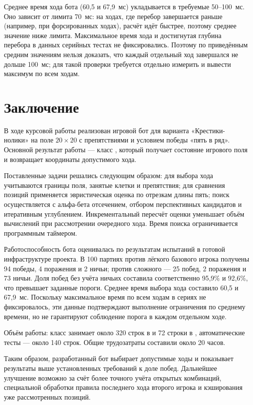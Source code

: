 \documentclass[14pt,a4paper]{extarticle}
\newcommand{\unnumsection}[1]{\section*{#1}\phantomsection\addcontentsline{toc}{section}{#1}}
\begin{document}
	Среднее время хода бота (60,5 и 67,9~мс) укладывается в требуемые 50--100~мс. Оно зависит от лимита 70~мс: на ходах, где перебор завершается раньше (например, при форсированных ходах), расчёт идёт быстрее, поэтому среднее значение ниже лимита. Максимальное время хода и достигнутая глубина перебора в данных серийных тестах не фиксировались. Поэтому по приведённым средним значениям нельзя доказать, что каждый отдельный ход завершался не дольше 100~мс; для такой проверки требуется отдельно измерить и вывести максимум по всем ходам.
	
	
	\unnumsection{Заключение}
	
	В ходе курсовой работы реализован игровой бот для варианта «Крестики-нолики» на поле $20\times20$ с препятствиями и условием победы «пять в ряд». Основной результат работы --- класс , который получает состояние игрового поля и возвращает координаты допустимого хода.
	
	Поставленные задачи решались следующим образом: для выбора хода учитываются границы поля, занятые клетки и препятствия; для сравнения позиций применяется эвристическая оценка по отрезкам длины пять; поиск осуществляется с альфа-бета отсечением, отбором перспективных кандидатов и итеративным углублением. Инкрементальный пересчёт оценки уменьшает объём вычислений при рассмотрении очередного хода. Время поиска ограничивается программным таймером.
	
	Работоспособность бота оценивалась по результатам испытаний в готовой инфраструктуре проекта. В 100 партиях против лёгкого базового игрока получены 94 победы, 4 поражения и 2 ничьи; против сложного --- 25 побед, 2 поражения и 73 ничьи. Доля побед без учёта ничьих составила соответственно 95,9\% и 92,6\%, что превышает заданные пороги. Среднее время выбора хода составило 60,5 и 67,9~мс. Поскольку максимальное время по всем ходам в сериях не фиксировалось, эти данные подтверждают выполнение ограничения по среднему времени, но не гарантируют соблюдение порога в каждом отдельном ходе.
	
	Объём работы: класс  занимает около 320 строк в  и 72 строки в , автоматические тесты --- около 140 строк. Общие трудозатраты составили около 20 часов.
	
	Таким образом, разработанный бот выбирает допустимые ходы и показывает результаты выше установленных требований к доле побед. Дальнейшее улучшение возможно за счёт более точного учёта открытых комбинаций, специальной обработки правила последнего хода второго игрока и кэширования уже рассмотренных позиций.
	
\end{document}
